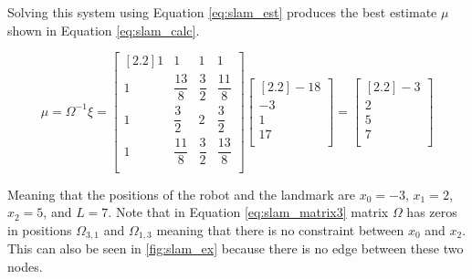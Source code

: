 Solving this system using Equation \ref{eq:slam_est} produces the best estimate $\mu$ shown in Equation \ref{eq:slam_calc}.

\begin{equation}
\label{eq:slam_calc}
\mu = \Omega^{-1}\xi = 
\begin{bmatrix}[2.2]
1 & 1 & 1 & 1 \\
1 & \dfrac{13}{8} & \dfrac{3}{2} & \dfrac{11}{8} \\
1 & \dfrac{3}{2} & 2 & \dfrac{3}{2} \\
1 & \dfrac{11}{8} & \dfrac{3}{2} & \dfrac{13}{8} \\
\end{bmatrix}
\begin{bmatrix}[2.2]
-18 \\
-3 \\
1 \\
17 \\
\end{bmatrix} =
\begin{bmatrix}[2.2]
-3 \\
2 \\
5 \\
7 \\
\end{bmatrix}
\end{equation}

Meaning that the positions of the robot and the landmark are $x_0 = -3$, $x_1 = 2$, $x_2 = 5$, and $L = 7$. Note that in Equation \ref{eq:slam_matrix3} matrix $\Omega$ has zeros in positions $\Omega_{3,1}$ and $\Omega_{1,3}$ meaning that there is no constraint between $x_0$ and $x_2$. This can also be seen in \autoref{fig:slam_ex} because there is no edge between these two nodes.

